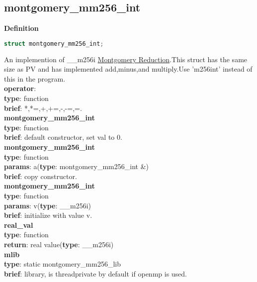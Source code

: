 \documentclass[8pt, a4paper, oneside, twocolumn]{article}
\begin{document}
\subsection{montgomery\_mm256\_int}
\noindent \large \textbf{Definition} \normalsize
\begin{lstlisting}[language=c++]
struct montgomery_mm256_int;
\end{lstlisting}
An implemention of \_\_m256i \href{https://en.wikipedia.org/wiki/Montgomery_modular_multiplication}{Montgomery Reduction}.This struct has the same size as PV and has implemented add,minus,and multiply.Use 'm256int' instead of this in the program.\\
\textbf{operator}:\\
\indent\textbf{type}: function\\
\indent\textbf{brief}: *,*=,+,+=,-,-=,=.\\
\textbf{montgomery\_mm256\_int}\\
\indent\textbf{type}: function\\
\indent\textbf{brief}: default constructor, set val to $0$.\\
\textbf{montgomery\_mm256\_int}\\
\indent\textbf{type}: function\\
\indent\textbf{params}: a(\textbf{type}: montgomery\_mm256\_int \&)\\
\indent\textbf{brief}: copy constructor.\\
\textbf{montgomery\_mm256\_int}\\
\indent\textbf{type}: function\\
\indent\textbf{params}: v(\textbf{type}: \_\_m256i)\\
\indent\textbf{brief}: initialize with value v.\\
\textbf{real\_val}\\
\indent\textbf{type}: function\\
\indent\textbf{return}: real value(\textbf{type}: \_\_m256i)\\
\textbf{mlib}\\
\indent\textbf{type}: static montgomery\_mm256\_lib\\
\indent\textbf{brief}: library, is threadprivate by default if openmp is used.\\
\end{document}
